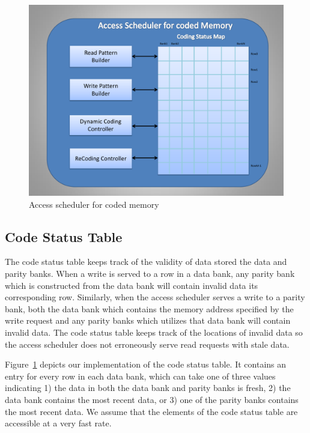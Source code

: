 \begin{figure}[tbp]
\centering
\includegraphics[width=0.7\linewidth]{fig/coded_access_scheduler.pdf}
\caption{
{Access scheduler for coded memory} }
\label{fig:coded_access_scheduler}
\end{figure}
\subsection{Code Status Table}
\label{sec:codeStatusTable}
The code status table keeps track of the validity of data stored the data and parity banks. When a write is served to a row in a data bank, any parity bank which is constructed from the data bank will contain invalid data its corresponding row. Similarly, when the access scheduler serves a write to a parity bank, both the data bank which contains the memory address specified by the write request and any parity banks which utilizes that data bank will contain invalid data. The code status table keeps track of the locations of invalid data so the access scheduler does not erroneously serve read requests with stale data.

Figure~\ref{fig:coded_access_scheduler} depicts our implementation of the code status table. It contains an entry for every row in each data bank, which can take one of three values indicating 1) the data in both the data bank and parity banks is fresh, 2) the data bank contains the most recent data, or 3) one of the parity banks contains the most recent data. 
We assume that the elements of the code status table are accessible at a very fast rate. 


